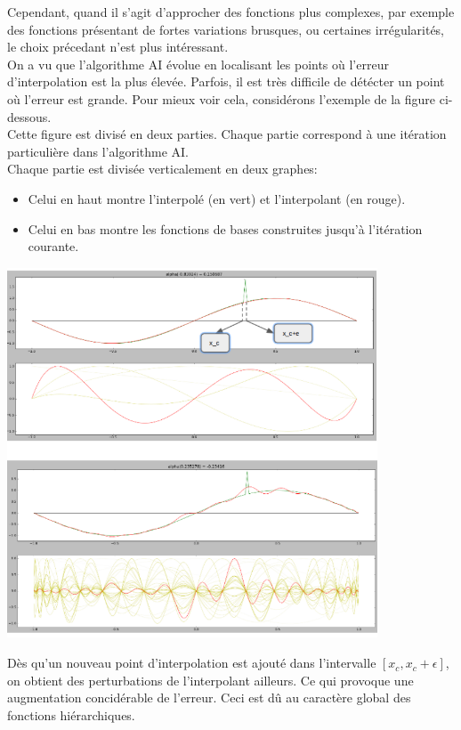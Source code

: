 \hspace{0.5cm}Cependant, quand il s'agit d'approcher des fonctions plus complexes, par exemple des fonctions présentant de fortes variations brusques, ou certaines irrégularités, le choix précedant n'est
plus intéressant.\\

\hspace{0.5cm}On a vu que l'algorithme AI évolue en localisant les points où l'erreur d'interpolation est la plus élevée. Parfois, il est très difficile de détécter
un point où l'erreur est grande. Pour mieux voir cela, considérons l'exemple de la figure ci-dessous. \\
Cette figure est divisé en deux parties. Chaque partie correspond à une itération particulière dans l'algorithme AI.\\
Chaque partie est divisée verticalement en deux graphes:
\begin{itemize}
\item Celui en haut montre l'interpolé (en vert) et l'interpolant (en rouge).
\item Celui en bas montre les fonctions de bases construites jusqu'à l'itération courante.
\end{itemize}
\begin{center}
\includegraphics[height= 11cm,width = 11cm]{images/lag_glob.png}
\end{center}
\newpage
Dès qu'un nouveau point d'interpolation est ajouté dans l'intervalle $ \left [ x_c, x_c+\epsilon \right ]$, on obtient des perturbations de l'interpolant ailleurs.
Ce qui provoque une augmentation concidérable de l'erreur. Ceci est dû au caractère global des fonctions hiérarchiques.\\

